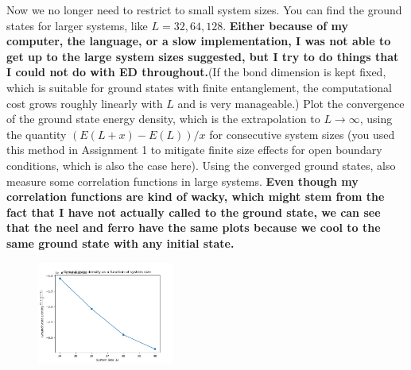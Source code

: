 \documentclass[12pt]{article}
\begin{document}
Now we no longer need to restrict to small system sizes. You can find the ground states for larger systems, like $L=32,64,128$. \textbf{Either because of my computer, the language, or a slow implementation, I was not able to get up to the large system sizes suggested, but I try to do things that I could not do with ED throughout.}(If the bond dimension is kept fixed, which is suitable for ground states with finite entanglement, the computational cost grows roughly linearly with $L$ and is very manageable.) Plot the convergence of the ground state energy density, which is the extrapolation to $L \rightarrow \infty$, using the quantity $(E(L+x)-E(L)) / x$ for consecutive system sizes (you used this method in Assignment 1 to mitigate finite size effects for open boundary conditions, which is also the case here). Using the converged ground states, also measure some correlation functions in large systems. \textbf{Even though my correlation functions are kind of wacky, which might stem from the fact that I have not actually called to the ground state, we can see that the neel and ferro have the same plots because we cool to the same ground state with any initial state.}
\begin{figure}[h!]
  \includegraphics[width=0.4\textwidth]{ground_state_density_tst.png}
\end{figure}
\end{document}
